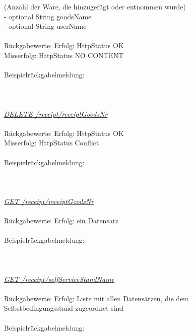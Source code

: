 \tab \tab 								(Anzahl der Ware, die hinzugefügt oder entnommen wurde) \\
\tab \tab                         		- optional String goodsName \\
\tab \tab                         		- optional String userName \\                  
\\
Rückgabewerte: \tab 					Erfolg: HttpStatus OK \\
\tab \tab 								Misserfolg: HttpStatus NO CONTENT \\
\\
Beispielrückgabelmeldung:	
\\
\\
\\
\\
\textit{\underline{DELETE /receipt/{receiptGoodsNr}}}
\\              
\\
Rückgabewerte: \tab 					Erfolg: HttpStatus OK \\
\tab \tab 								Misserfolg: HttpStatus Conflict \\
\\
Beispielrückgabelmeldung:	
\\
\\
\\
\\
\textit{\underline{GET /receipt/{receiptGoodsNr}}}
\\              
\\
Rückgabewerte: \tab 					Erfolg: ein Datensatz \\
\\
Beispielrückgabelmeldung:	
\\
\\
\\
\\
\textit{\underline{GET /receipt/{selfServiceStandName}}}
\\                
\\
Rückgabewerte: \tab 					Erfolg: Liste mit allen Datensätzen, die dem Selbstbedingungsstand zugeordnet sind\\
\\
Beispielrückgabelmeldung:	
\\
\\
\\
\\
